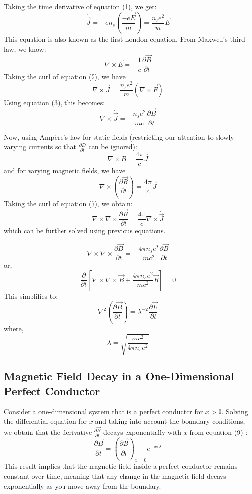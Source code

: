 \documentclass{article}
\begin{document}
Taking the time derivative of equation (1), we get:
\[
\dot{\vec{J}} = -en_s \left( \frac{-e \vec{E}}{m} \right) = \frac{n_s e^2}{m} \vec{E} \tag{2}
\]
This equation is also known as the first London equation. From Maxwell's third law, we know:
\[
\nabla \times \vec{E} = - \frac{1}{c} \frac{\partial \vec{B}}{\partial t} \tag{3}
\]
Taking the curl of equation (2), we have:
\[
\nabla \times \dot{\vec{J}} = \frac{n_s e^2}{m} (\nabla \times \vec{E}) \tag{4}
\]
Using equation (3), this becomes:
\[
\nabla \times \dot{\vec{J}} = - \frac{n_s e^2}{mc} \frac{\partial \vec{B}}{\partial t} \tag{5}
\]

Now, using Ampère's law for static fields (restricting our attention to slowly varying currents so that \(\frac{\partial D}{\partial t}\) can be ignored):
\[
\nabla \times \vec{B} = \frac{4 \pi}{c} \vec{J} \tag{6}
\]
and for varying magnetic fields, we have:
\[
\nabla \times \left( \frac{\partial \vec{B}}{\partial t} \right) = \frac{4 \pi}{c} \dot{\vec{J}} \tag{7}
\]
Taking the curl of equation (7), we obtain:
\[
    \nabla \times \nabla \times \frac{\partial \vec{B}}{\partial t} = \frac{4 \pi}{c} \nabla \times \dot{\vec{J}}
\]
which can be further solved using previous equations.

\[
\nabla \times \nabla \times \frac{\partial \vec{B}}{\partial t} = - \frac{4 \pi n_s e^2}{mc^2} \frac{\partial \vec{B}}{\partial t} \tag{8}
\]
or,
\[
\frac{\partial}{\partial t} \left[ \nabla \times \nabla \times \vec{B} + \frac{4 \pi n_s e^2}{mc^2} \vec{B} \right] = 0
\]
This simplifies to:
\[
\nabla^2 \left( \frac{\partial \vec{B}}{\partial t} \right) = \lambda^{-2} \frac{\partial \vec{B}}{\partial t} \tag{9}
\]
where,
\[
\lambda = \sqrt{\frac{mc^2}{4 \pi n_s e^2}} \tag{10}
\]

\subsection{Magnetic Field Decay in a One-Dimensional Perfect Conductor}

Consider a one-dimensional system that is a perfect conductor for \(x > 0\). Solving the differential equation for \(x\) and taking into account the boundary conditions, we obtain that the derivative \(\frac{\partial \vec{B}}{\partial t}\) decays exponentially with \(x\) from equation (9) :
\[
\frac{\partial \vec{B}}{\partial t} = \left( \frac{\partial \vec{B}}{\partial t} \right)_{x=0} e^{-x/\lambda} \tag{11}
\]
This result implies that the magnetic field inside a perfect conductor remains constant over time, meaning that any change in the magnetic field decays exponentially as you move away from the boundary.
\end{document}
